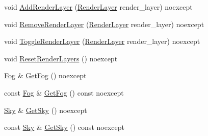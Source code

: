 \begin{DoxyCompactItemize}
\item 
void \hyperlink{classmage_1_1rendering_1_1_camera_settings_a921ff9ebe3ff05890f0e3dd8b71fcb7f}{Add\+Render\+Layer} (\hyperlink{namespacemage_1_1rendering_a466c2a441ea5b26e4625c2f34e021b3d}{Render\+Layer} render\+\_\+layer) noexcept
\item 
void \hyperlink{classmage_1_1rendering_1_1_camera_settings_a49c766f4880c798a90a9b8fe488a6711}{Remove\+Render\+Layer} (\hyperlink{namespacemage_1_1rendering_a466c2a441ea5b26e4625c2f34e021b3d}{Render\+Layer} render\+\_\+layer) noexcept
\item 
void \hyperlink{classmage_1_1rendering_1_1_camera_settings_a95c531aba7bbddba9ea47000de3c53b2}{Toggle\+Render\+Layer} (\hyperlink{namespacemage_1_1rendering_a466c2a441ea5b26e4625c2f34e021b3d}{Render\+Layer} render\+\_\+layer) noexcept
\item 
void \hyperlink{classmage_1_1rendering_1_1_camera_settings_a954a0af8d7939069e32b77abc23f95d0}{Reset\+Render\+Layers} () noexcept
\item 
\hyperlink{classmage_1_1rendering_1_1_fog}{Fog} \& \hyperlink{classmage_1_1rendering_1_1_camera_settings_a47b2b9eeca9d9eec61a7e290e1abfa43}{Get\+Fog} () noexcept
\item 
const \hyperlink{classmage_1_1rendering_1_1_fog}{Fog} \& \hyperlink{classmage_1_1rendering_1_1_camera_settings_acd360516b025b09c2ac668f48d6259c7}{Get\+Fog} () const noexcept
\item 
\hyperlink{classmage_1_1rendering_1_1_sky}{Sky} \& \hyperlink{classmage_1_1rendering_1_1_camera_settings_a3538572fc79fa03380cb9ed8cceeba42}{Get\+Sky} () noexcept
\item 
const \hyperlink{classmage_1_1rendering_1_1_sky}{Sky} \& \hyperlink{classmage_1_1rendering_1_1_camera_settings_a0045fb85eafcb33dff43c04656c4cc3b}{Get\+Sky} () const noexcept
\end{DoxyCompactItemize}
